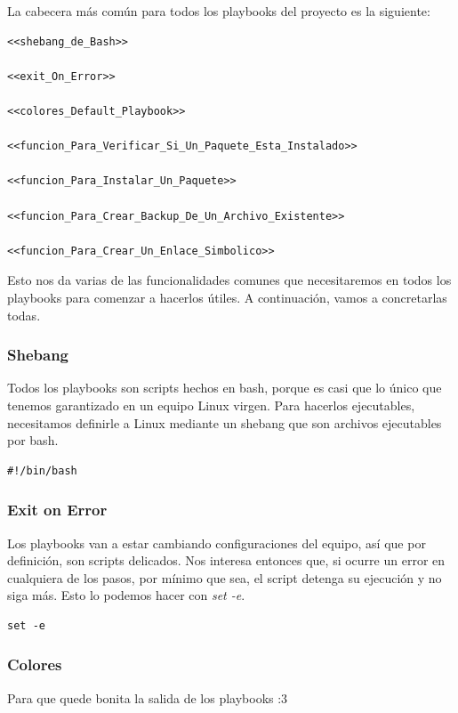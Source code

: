 \documentclass[11pt]{article}
\begin{document}
La cabecera más común para todos los playbooks del proyecto es la siguiente:

\begin{verbatim}
<<shebang_de_Bash>>

<<exit_On_Error>>

<<colores_Default_Playbook>>

<<funcion_Para_Verificar_Si_Un_Paquete_Esta_Instalado>>

<<funcion_Para_Instalar_Un_Paquete>>

<<funcion_Para_Crear_Backup_De_Un_Archivo_Existente>>

<<funcion_Para_Crear_Un_Enlace_Simbolico>>

\end{verbatim}

Esto nos da varias de las funcionalidades comunes que necesitaremos en todos los playbooks para comenzar a hacerlos útiles. A continuación, vamos a concretarlas todas.
\subsubsection{Shebang}
\label{sec:org58f0c3a}

Todos los playbooks son scripts hechos en bash, porque es casi que lo único que tenemos garantizado en un equipo Linux virgen. Para hacerlos ejecutables, necesitamos definirle a Linux mediante un shebang que son archivos ejecutables por bash.

\begin{verbatim}
#!/bin/bash
\end{verbatim}
\subsubsection{Exit on Error}
\label{sec:orgc567e59}

Los playbooks van a estar cambiando configuraciones del equipo, así que por definición, son scripts delicados. Nos interesa entonces que, si ocurre un error en cualquiera de los pasos, por mínimo que sea, el script detenga su ejecución y no siga más. Esto lo podemos hacer con \emph{set -e}.

\begin{verbatim}
set -e
\end{verbatim}
\subsubsection{Colores}
\label{sec:org827da57}

Para que quede bonita la salida de los playbooks :3
\end{document}
